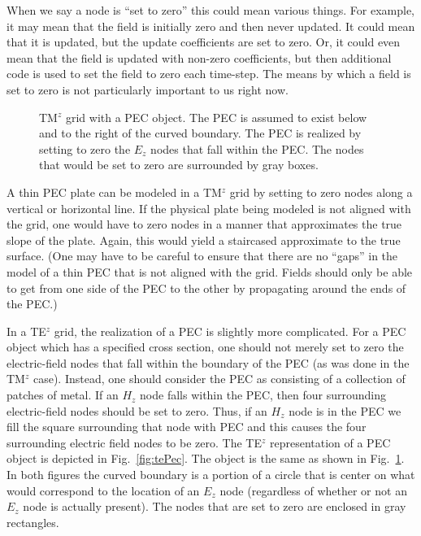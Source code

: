 When we say a node is ``set to zero'' this could mean various things.
For example, it may mean that the field is initially zero and then
never updated.  It could mean that it is updated, but the update
coefficients are set to zero.  Or, it could even mean that the field
is updated with non-zero coefficients, but then additional code is
used to set the field to zero each time-step.  The means by which a
field is set to zero is not particularly important to us right now.

\begin{figure}
  \begin{center}
  \end{center} 
  \caption{TM$^z$ grid with a PEC object.  The PEC is assumed to exist
  below and to the right of the curved boundary.  The PEC is realized
  by setting to zero the $E_z$ nodes that fall within the PEC.  The
  nodes that would be set to zero are surrounded by gray boxes.}
  \label{fig:tmPec}
\end{figure}

A thin PEC plate can be modeled in a TM$^z$ grid by setting to zero
nodes along a vertical or horizontal line.  If the physical plate
being modeled is not aligned with the grid, one would have to zero
nodes in a manner that approximates the true slope of the plate.
Again, this would yield a staircased approximate to the true surface.
(One may have to be careful to ensure that there are no ``gaps'' in
the model of a thin PEC that is not aligned with the grid.  Fields
should only be able to get from one side of the PEC to the other by
propagating around the ends of the PEC.)

In a TE$^z$ grid, the realization of a PEC is slightly more
complicated.  For a PEC object which has a specified cross section,
one should not merely set to zero the electric-field nodes that fall
within the boundary of the PEC (as was done in the TM$^z$ case).
Instead, one should consider the PEC as consisting of a collection of
patches of metal.  If an $H_z$ node falls within the PEC, then four
surrounding electric-field nodes should be set to zero.  Thus, if an
$H_z$ node is in the PEC we fill the square surrounding that node with
PEC and this causes the four surrounding electric field nodes to be
zero.  The TE$^z$ representation of a PEC object is depicted in Fig.\
\ref{fig:tePec}.  The object is the same as shown in Fig.\
\ref{fig:tmPec}.  In both figures the curved boundary is a portion of
a circle that is center on what would correspond to the location of an
$E_z$ node (regardless of whether or not an $E_z$ node is actually
present).  The nodes that are set to zero are enclosed in gray
rectangles.

